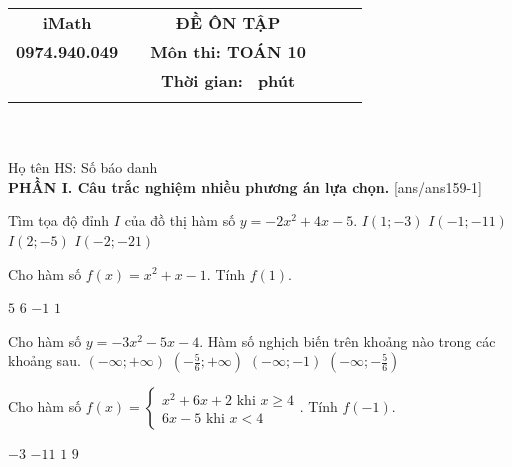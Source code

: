 \documentclass[12pt,a4paper]{article}
\newcommand{\tenso}{iMath}
\newcommand{\tentruong}{0974.940.049}
\newcommand{\tenkythi}{ĐỀ ÔN TẬP}
\newcommand{\tenmonthi}{Môn thi: TOÁN 10}
\newcommand{\thoigian}{}
\newcommand{\tieude}[1]{
   \begin{tabular}{cm{3cm}cm{3cm}cm{3cm}}
    {\bf \tenso} & & {\bf \tenkythi} \\
    {\bf \tentruong} & & {\bf \tenmonthi}\\
    && {\bf Thời gian: \bf \thoigian \, phút}\\
    && { \fbox{\bf Mã đề: #1}}
   \end{tabular}\\\\
    
   {Họ tên HS: \dotfill Số báo danh \dotfill}\\
}
\newcommand{\chantrang}[2]{\rfoot{Trang \thepage $-$ Mã đề #2}}
\begin{document}


\tieude{159}
\chantrang{\pageref{LastPage}}{159}
\setcounter{page}{1}
{\bf PHẦN I. Câu trắc nghiệm nhiều phương án lựa chọn.}
\setcounter{ex}{0}
[ans/ans159-1]
\begin{ex}
 Tìm tọa độ đỉnh ${I}$ của đồ thị hàm số $y=- 2 x^{2} + 4 x - 5$.
\choice
{ \True ${I\left(1;-3\right)}$ }
   { ${I\left(-1;-11\right)}$ }
     { ${I\left(2;-5\right)}$ }
    { ${I\left(-2;-21\right)}$ }
\end{ex}

\begin{ex}
 Cho hàm số $f(x)=x^{2} + x - 1$. Tính $f(1)$.

 
\choice
{ $ {5 }$ }
   { $ {6}$ }
     { $ {-1}$ }
    { \True ${ 1 }$ }
\end{ex}

\begin{ex}
 Cho hàm số $y=- 3 x^{2} - 5 x - 4 $. Hàm số nghịch biến trên khoảng nào trong các khoảng sau.
\choice
{ $\left(-\infty; +\infty\right)$ }
   { \True $\left(- \frac{5}{6} ; +\infty\right)$ }
     { $\left(-\infty; -1\right)$ }
    { $\left(-\infty; - \frac{5}{6}\right)$ }
\end{ex}

\begin{ex}
 Cho hàm số $f(x)=\left\{ \begin{array}{l} 
     x^{2} + 6 x + 2 \text{ khi } x \ge 4  \\ 
     6 x - 5 \text{          khi  } x < 4  
     \end{array} \right.$. Tính $f(-1)$.

 
\choice
{ $ {-3 }$ }
   { \True ${ -11 }$ }
     { $ {1}$ }
    { $ {9}$ }
\end{ex}
\end{document}
